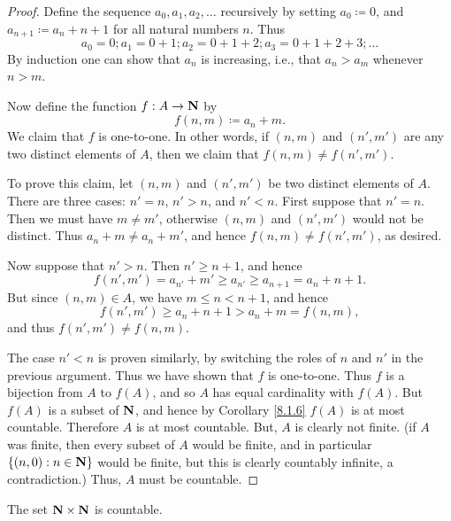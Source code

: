 \begin{proof}
    Define the sequence \(a_0, a_1, a_2, \dots\) recursively by setting \(a_0 \coloneqq 0\), and \(a_{n + 1} \coloneqq a_n + n + 1\) for all natural numbers \(n\).
    Thus
    \[
        a_0 = 0; a_1 = 0 + 1; a_2 = 0 + 1 + 2; a_3 = 0 + 1 + 2 + 3; \dots
    \]
    By induction one can show that \(a_n\) is increasing, i.e., that \(a_n > a_m\) whenever \(n > m\).

    Now define the function \(f : A \to \mathbf{N}\) by
    \[
        f(n, m) \coloneqq a_n + m.
    \]
    We claim that \(f\) is one-to-one.
    In other words, if \((n, m)\) and \((n', m')\) are any two distinct elements of \(A\), then we claim that \(f(n, m) \neq f(n', m')\).

    To prove this claim, let \((n, m)\) and \((n', m')\) be two distinct elements of \(A\).
    There are three cases: \(n' = n\), \(n' > n\), and \(n' < n\).
    First suppose that \(n' = n\).
    Then we must have \(m \neq m'\), otherwise \((n, m)\) and \((n', m')\) would not be distinct.
    Thus \(a_n + m \neq a_n + m'\), and hence \(f(n, m) \neq f(n', m')\), as desired.

    Now suppose that \(n' > n\).
    Then \(n' \geq n + 1\), and hence
    \[
        f(n', m') = a_{n'} + m' \geq a_{n'} \geq a_{n + 1} = a_n + n + 1.
    \]
    But since \((n, m) \in A\), we have \(m \leq n < n + 1\), and hence
    \[
        f(n', m') \geq a_n + n + 1 > a_n + m = f(n, m),
    \]
    and thus \(f(n', m') \neq f(n, m)\).

    The case \(n' < n\) is proven similarly, by switching the roles of \(n\) and \(n'\) in the previous argument.
    Thus we have shown that \(f\) is one-to-one.
    Thus \(f\) is a bijection from \(A\) to \(f(A)\), and so \(A\) has equal cardinality with \(f(A)\).
    But \(f(A)\) is a subset of \(\mathbf{N}\), and hence by Corollary \ref{8.1.6} \(f(A)\) is at most countable.
    Therefore \(A\) is at most countable.
    But, \(A\) is clearly not finite.
    (if \(A\) was finite, then every subset of \(A\) would be finite, and in particular \(\{(n, 0) : n \in \mathbf{N}\}\) would be finite, but this is clearly countably infinite, a contradiction.)
    Thus, \(A\) must be countable.
\end{proof}

\begin{corollary}\label{8.1.13}
    The set \(\mathbf{N} \times \mathbf{N}\) is countable.
\end{corollary}

